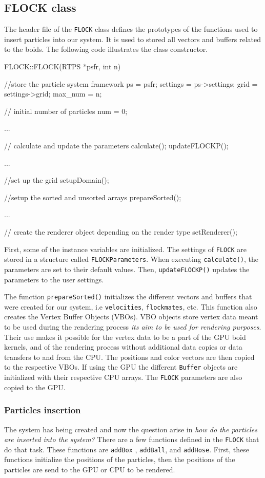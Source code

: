 \subsection{FLOCK class}
The header file of the \texttt{FLOCK} class defines the prototypes of the functions used to insert particles into our system. It is used to stored all vectors and buffers related to the boids. The following code illustrates the class constructor. 

\begin{cppcode}{0}
FLOCK::FLOCK(RTPS *psfr, int n)
 {
 	//store the particle system framework
 	ps = psfr;
	settings = ps->settings;
	grid = settings->grid;
	max_num = n;
	
	// initial number of particles
	num = 0;
 	
	...
 
 	// calculate and update the parameters
	calculate();
	updateFLOCKP();

	...

	//set up the grid
	setupDomain();
	
	//setup the sorted and unsorted arrays
	prepareSorted();
 	 
	 ...
		
	// create the renderer object depending on the render type		
	setRenderer(); 
}
\end{cppcode}

First, some of the instance variables are initialized. The settings of \texttt{FLOCK} are stored in a structure called \texttt{FLOCKParameters}. When executing \texttt{calculate()}, the parameters 
are set to their default values. Then, \texttt{updateFLOCKP()} updates the parameters to the user settings.

The function \texttt{prepareSorted()} initializes the different vectors and buffers that were created for our system, i.e \texttt{velocities}, \texttt{flockmates}, etc. This function also creates the Vertex Buffer Objects (VBOs). VBO objects store vertex data meant to be used during the rendering process {\em its aim to be used for rendering purposes}\cite{vbo}. Their use makes it possible for the vertex data to be a part of the GPU boid kernels, and of the rendering process without additional data copies or data transfers to and from the CPU. The positions and color vectors are then copied to the respective VBOs. If using the GPU the different \texttt{Buffer} objects are initialized with their respective CPU arrays. The \texttt{FLOCK} parameters are also copied to the GPU. 

\subsubsection{Particles insertion}
The system has being created and now the question arise in \textit{how do the particles are inserted into the system?} There are a few functions defined in the \texttt{FLOCK} that do that task. These functions are \texttt{addBox} , \texttt{addBall}, and \texttt{addHose}. First, these functions initialize the positions of the particles, then the positions of the particles are send to the GPU or CPU to be rendered. 


